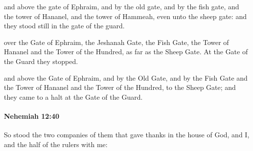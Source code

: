 			\begin{versebox}
					\item[BHS] 
					\item[LXX] 
					\item[ASV] and above the gate of Ephraim, and by the old gate, and by the fish gate, and the tower of Hananel, and the tower of Hammeah, even unto the sheep gate: and they stood still in the gate of the guard.
					\item[NIV] over the Gate of Ephraim, the Jeshanah Gate, the Fish Gate, the Tower of Hananel and the Tower of the Hundred, as far as the Sheep Gate. At the Gate of the Guard they stopped.
					\item[NRSV] and above the Gate of Ephraim, and by the Old Gate, and by the Fish Gate and the Tower of Hananel and the Tower of the Hundred, to the Sheep Gate; and they came to a halt at the Gate of the Guard.
			\end{versebox}

		\paragraph{Nehemiah 12:40} %
			\label{NEHEMIAH-12-40}

			So stood the two companies of them that gave thanks in the house of God, and I, and the half of the rulers with me:

